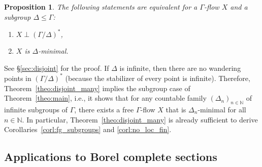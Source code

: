 \documentclass[11pt,reqno,psamsfonts]{amsart}
\theoremstyle{bfnote}
\newtheorem{prop}[theo]{Proposition}
\theoremstyle{definition}
\theoremstyle{remark}
\newcommand{\0}{\varnothing}
\renewcommand{\leq}{\leqslant}
\newcommand{\bemph}[1]{{\normalfont#1}}
\newcommand{\ep}[1]{\bemph{(}#1\bemph{)}}
\newcommand{\G}{\Gamma}
\newcommand{\N}{\mathbb{N}}
\numberwithin{equation}{section}
\begin{document}
    \begin{prop}\label{prop:cosets}
        The following statements are equivalent for a $\G$-flow $X$ and a subgroup $\Delta \leq \G$:
        \begin{enumerate}[label=\ep{\normalfont\arabic*}]
            \item $X \perp (\G/\Delta)^*$,
            \item $X$ is $\Delta$-minimal.
        \end{enumerate}
    \end{prop}

    See \S\ref{sec:disjoint} for the proof. If $\Delta$ is infinite, then there are no wandering points in $(\G/\Delta)^*$ (because the stabilizer of every point is infinite). Therefore, Theorem~\ref{theo:disjoint_many} implies the subgroup case of Theorem~\ref{theo:main}, i.e., it shows that for any countable family $(\Delta_n)_{n \in \N}$ of infinite subgroups of $\G$, there exists a free $\G$-flow $X$ that is $\Delta_n$-minimal for all $n \in \N$. In particular, Theorem~\ref{theo:disjoint_many} is already sufficient to derive Corollaries~\ref{corl:fg_subgroups} and \ref{corl:no_loc_fin}.

    

    \subsection{Applications to Borel complete sections}\label{subsec:sections}
\end{document}
